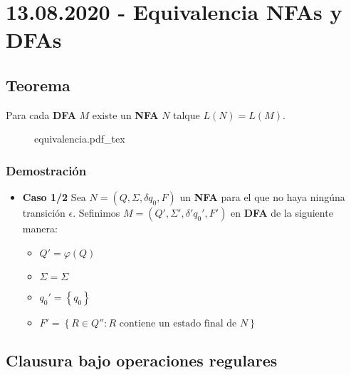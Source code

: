 \documentclass[a4paper]{book}
\newcommand{\incfig}[2][1]{%
    \def\svgwidth{#1\columnwidth}
    {#2.pdf_tex}
}
\begin{document}
\section{13.08.2020 - Equivalencia NFAs y DFAs}
\label{sec:equivalencia_nfas_y_dfas}

\subsection{Teorema}

Para cada \textbf{DFA} \(M\) existe un \textbf{NFA} \(N\) talque \(L\left(N\right)=L\left(M\right)\).
\begin{figure}[ht]
    \centering
    \incfig{equivalencia}
    \label{fig:equivalencia}
\end{figure}

\subsubsection{Demostración}

\begin{itemize}
    \item \textbf{Caso 1/2}
        Sea \(N=\left(Q,\Sigma,\delta q_0,F\right)\) un \textbf{NFA} para el
        que no haya ningúna transición \(\epsilon \). Sefinimos
        \(M=\left(Q',\Sigma',\delta'q_0',F' \right) \) en \textbf{DFA} de la
        siguiente manera:

        \begin{itemize}
            \item \(Q'=\varphi\left( Q \right) \)
            \item \(\Sigma=\Sigma\)
            \item \(q_0'=\left\{q_0\right\}\)
            \item \(F'=\left\{ R\in Q'': R \text{ contiene un estado final de } N \right\} \)
        \end{itemize}


\end{itemize}

\subsection{Clausura bajo operaciones regulares}
\label{ssec:clausura_bajo_operaciones_regulares}
\end{document}
